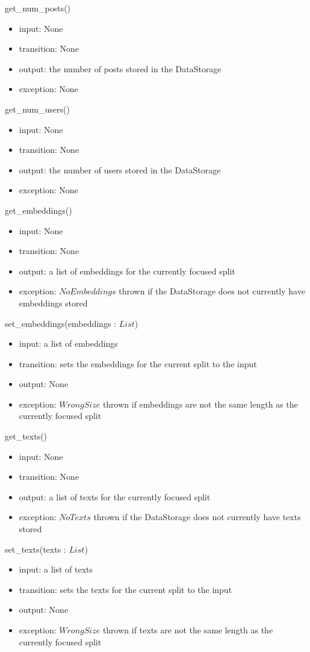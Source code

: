 \documentclass[12pt, titlepage]{article}
\begin{document}
\noindent get\_num\_posts()
\begin{itemize}
\item input: None
\item transition: None
\item output: the number of posts stored in the DataStorage
\item exception: None
\end{itemize}

\noindent get\_num\_users()
\begin{itemize}
\item input: None
\item transition: None
\item output: the number of users stored in the DataStorage
\item exception: None
\end{itemize}

\noindent get\_embeddings()
\begin{itemize}
\item input: None
\item transition: None
\item output: a list of embeddings for the currently focused split
\item exception: $NoEmbeddings$ thrown if the DataStorage does not currently have embeddings stored
\end{itemize}

\noindent set\_embeddings(embeddings : $List$)
\begin{itemize}
\item input: a list of embeddings
\item transition: sets the embeddings for the current split to the input
\item output: None
\item exception: $WrongSize$ thrown if embeddings are not the same length as the currently focused split
\end{itemize}

\noindent get\_texts()
\begin{itemize}
\item input: None
\item transition: None
\item output: a list of texts for the currently focused split
\item exception: $NoTexts$ thrown if the DataStorage does not currently have texts stored
\end{itemize}

\noindent set\_texts(texts : $List$)
\begin{itemize}
\item input: a list of texts
\item transition: sets the texts for the current split to the input
\item output: None
\item exception: $WrongSize$ thrown if texts are not the same length as the currently focused split
\end{itemize}
\end{document}
